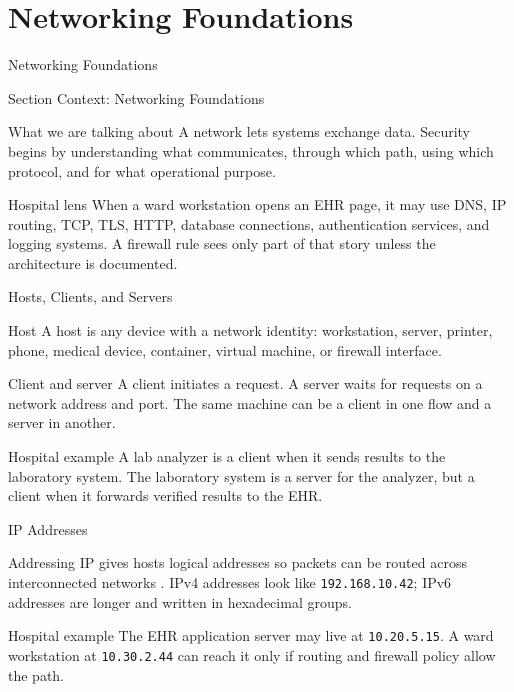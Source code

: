 \documentclass[presentation]{beamer}
\newcommand{\sectiontitleframe}[1]{
\begin{frame}[plain,c]
\begin{center}
{\usebeamerfont{title}\usebeamercolor[fg]{title}#1}
\end{center}
\end{frame}
}
\begin{document}
\section{Networking Foundations}
\sectiontitleframe{Networking Foundations}

\begin{frame}[c]{Section Context: Networking Foundations}
\begin{block}{What we are talking about}
A network lets systems exchange data. Security begins by understanding what communicates, through
which path, using which protocol, and for what operational purpose.
\end{block}

\begin{exampleblock}{Hospital lens}
When a ward workstation opens an EHR page, it may use DNS, IP routing, TCP, TLS, HTTP, database
connections, authentication services, and logging systems. A firewall rule sees only part of that
story unless the architecture is documented.
\end{exampleblock}
\end{frame}

\begin{frame}[c]{Hosts, Clients, and Servers}
\begin{block}{Host}
A host is any device with a network identity: workstation, server, printer, phone, medical device,
container, virtual machine, or firewall interface.
\end{block}

\begin{block}{Client and server}
A client initiates a request. A server waits for requests on a network address and port. The same
machine can be a client in one flow and a server in another.
\end{block}

\begin{exampleblock}{Hospital example}
A lab analyzer is a client when it sends results to the laboratory system. The laboratory system is
a server for the analyzer, but a client when it forwards verified results to the EHR.
\end{exampleblock}
\end{frame}

\begin{frame}[c]{IP Addresses}
\begin{block}{Addressing}
IP gives hosts logical addresses so packets can be routed across interconnected networks
\cite{rfc791}. IPv4 addresses look like \texttt{192.168.10.42}; IPv6 addresses are longer and written
in hexadecimal groups.
\end{block}

\begin{exampleblock}{Hospital example}
The EHR application server may live at \texttt{10.20.5.15}. A ward workstation at
\texttt{10.30.2.44} can reach it only if routing and firewall policy allow the path.
\end{exampleblock}
\end{frame}
\end{document}
